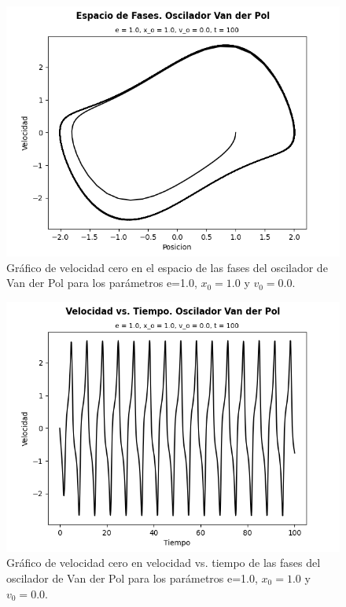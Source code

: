 \documentclass{article}
\begin{document}
	\newpage
	
	\begin{figure}[h!]
		\centering
		\ContinuedFloat*
		\includegraphics[width=0.8\linewidth]{VELOCIDAD CERO 1}
		\caption{Gr\'afico de velocidad cero en el espacio de las fases del oscilador de Van der Pol para los par\'ametros e=1.0, $x_0=1.0$ y $v_0=0.0$.}
	\end{figure}
	
	\begin{figure}[h!]
		\centering
		\ContinuedFloat
		\includegraphics[width=0.8\linewidth]{VELOCIDAD CERO 2}
		\caption{Gr\'afico de velocidad cero en velocidad vs. tiempo de las fases del oscilador de Van der Pol para los par\'ametros e=1.0, $x_0=1.0$ y $v_0=0.0$.}
	\end{figure}
	
	\newpage
	
	\printbibliography
	
\end{document}
